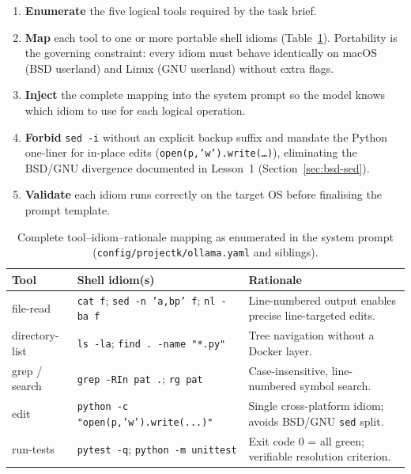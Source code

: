 \documentclass[11pt]{article}
\begin{document}
\begin{enumerate}[leftmargin=*,label=\textbf{Step~\arabic*.}]
  \item \textbf{Enumerate} the five logical tools required by the task brief.
  \item \textbf{Map} each tool to one or more portable shell idioms
        (Table~\ref{tab:tools-full}).  Portability is the governing constraint:
        every idiom must behave identically on macOS (BSD userland) and Linux
        (GNU userland) without extra flags.
  \item \textbf{Inject} the complete mapping into the system prompt so the
        model knows which idiom to use for each logical operation.
  \item \textbf{Forbid} \texttt{sed -i} without an explicit backup suffix and
        mandate the Python one-liner for in-place edits
        (\texttt{open(p,\!'w').write(\ldots)}), eliminating the BSD/GNU
        divergence documented in Lesson~1 (Section~\ref{sec:bsd-sed}).
  \item \textbf{Validate} each idiom runs correctly on the target OS before
        finalising the prompt template.
\end{enumerate}

\begin{table}[ht]
\centering
\caption{Complete tool--idiom--rationale mapping as enumerated in the system
         prompt (\texttt{config/projectk/ollama.yaml} and siblings).}
\label{tab:tools-full}
\begin{tabular}{p{2.1cm}p{4.2cm}p{4.0cm}}
\toprule
\textbf{Tool} & \textbf{Shell idiom(s)} & \textbf{Rationale} \\
\midrule
file-read &
  \texttt{cat f}; \texttt{sed -n 'a,bp' f}; \texttt{nl -ba f} &
  Line-numbered output enables precise line-targeted edits. \\[4pt]
directory-list &
  \texttt{ls -la}; \texttt{find . -name "*.py"} &
  Tree navigation without a Docker layer. \\[4pt]
grep / search &
  \texttt{grep -RIn pat .}; \texttt{rg pat} &
  Case-insensitive, line-numbered symbol search. \\[4pt]
edit &
  \texttt{python -c "open(p,'w').write(...)"} &
  Single cross-platform idiom; avoids BSD/GNU \texttt{sed} split. \\[4pt]
run-tests &
  \texttt{pytest -q}; \texttt{python -m unittest} &
  Exit code 0 = all green; verifiable resolution criterion. \\
\bottomrule
\end{tabular}
\end{table}
\end{document}
